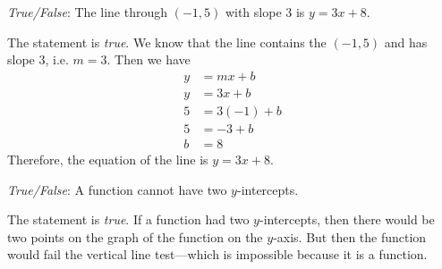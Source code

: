 \documentclass[11pt,letterpaper]{article}
\begin{document}
\quizsol \textit{True/False}: The line through $(-1, 5)$ with slope 3 is $y= 3x + 8$. \pspace

\sol The statement is \textit{true}. We know that the line contains the $(-1, 5)$ and has slope 3, i.e. $m= 3$. Then we have
	\[
	\begin{aligned}
	y&= mx + b \\
	y&= 3x + b \\
	5&= 3(-1) + b \\
	5&= -3 + b \\
	b&= 8 
	\end{aligned}
	\]
Therefore, the equation of the line is $y= 3x + 8$. 



\newpage



\quizsol \textit{True/False}: A function cannot have two $y$-intercepts. \pspace

\sol The statement is \textit{true}. If a function had two $y$-intercepts, then there would be two points on the graph of the function on the $y$-axis. But then the function would fail the vertical line test---which is impossible because it is a function. 
\end{document}
